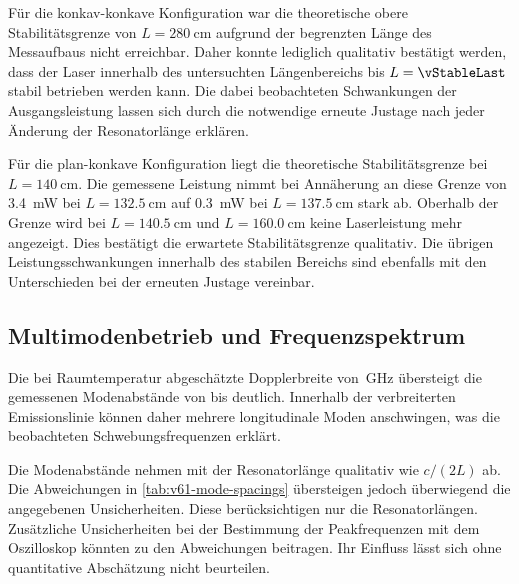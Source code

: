 Für die konkav-konkave Konfiguration war die theoretische obere
Stabilitätsgrenze von $L=\qty{280}{\centi\meter}$ aufgrund der begrenzten
Länge des Messaufbaus nicht erreichbar. Daher konnte lediglich qualitativ
bestätigt werden, dass der Laser innerhalb des untersuchten Längenbereichs
bis $L=\vStableLast$ stabil betrieben werden kann. Die dabei beobachteten
Schwankungen der Ausgangsleistung lassen sich durch die notwendige erneute
Justage nach jeder Änderung der Resonatorlänge erklären.

Für die plan-konkave Konfiguration liegt die theoretische Stabilitätsgrenze
bei $L=\qty{140}{\centi\meter}$. Die gemessene Leistung nimmt bei Annäherung
an diese Grenze von \qty{3.4}{\milli\watt} bei $L=\qty{132.5}{\centi\meter}$
auf \qty{0.3}{\milli\watt} bei $L=\qty{137.5}{\centi\meter}$ stark ab.
Oberhalb der Grenze wird bei $L=\qty{140.5}{\centi\meter}$ und
$L=\qty{160.0}{\centi\meter}$ keine Laserleistung mehr angezeigt.
Dies bestätigt die erwartete Stabilitätsgrenze qualitativ.
Die übrigen Leistungsschwankungen innerhalb des stabilen Bereichs sind
ebenfalls mit den Unterschieden bei der erneuten Justage vereinbar.

\subsection{Multimodenbetrieb und Frequenzspektrum}

Die bei Raumtemperatur abgeschätzte Dopplerbreite von
\vDoppler\,\unit{\giga\hertz} übersteigt die gemessenen Modenabstände von
\vLongSpacingMin{} bis \vLongSpacingMax{} deutlich. Innerhalb der
verbreiterten Emissionslinie können daher mehrere longitudinale Moden
anschwingen, was die beobachteten Schwebungsfrequenzen erklärt.

Die Modenabstände nehmen mit der Resonatorlänge qualitativ wie $c/(2L)$ ab.
Die Abweichungen in \autoref{tab:v61-mode-spacings} übersteigen jedoch
überwiegend die angegebenen Unsicherheiten. Diese berücksichtigen nur die
Resonatorlängen. Zusätzliche Unsicherheiten bei der Bestimmung der
Peakfrequenzen mit dem Oszilloskop könnten
zu den Abweichungen beitragen. Ihr Einfluss lässt sich ohne quantitative
Abschätzung nicht beurteilen.

\newpage

